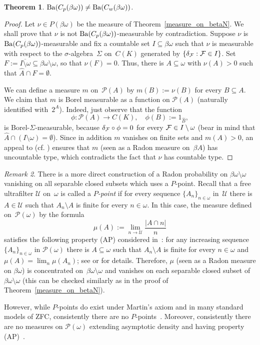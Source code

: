 \documentclass[12pt]{amsart}
\newcommand{\FF}{\protect{\mathcal F}}
\newcommand{\sm}{\setminus}
\newcommand{\sub}{\subseteq}
\newcommand{\Ba}{{\rm Ba}}
\newcommand{\UU}{{\mathcal U}}
\newcommand{\PP}{{\mathcal P}}
\newcommand{\0}{\protect{\bf 0}}
\newcommand{\1}{\protect{\bf 1}}
\newtheorem{theo}{Theorem}[section]
\theoremstyle{definition}
\theoremstyle{remark}
\newtheorem{remark}[theo]{Remark}
\numberwithin{equation}{section}
\begin{document}
\begin{theo}\label{neq_betaN}
$\Ba(C_p(\beta\omega)) \neq \Ba(C_w(\beta\omega))$.
\end{theo}
\begin{proof}
Let $\nu\in P(\beta\omega)$ be the measure of Theorem~\ref{measure_on_betaN}.
We shall prove that $\nu$ is not $\Ba(C_p(\beta\omega))$-measurable by contradiction. Suppose
$\nu$ is $\Ba(C_p(\beta\omega))$-measurable and fix a countable set $I\sub\beta\omega$ such that $\nu$ is measurable
with respect to the $\sigma$-algebra~$\Sigma$ on~$C(K)$ generated by $\{\delta_{\FF}: \FF\in I\}$. 
Set $F:=\overline{I\sm\omega} \sub \beta\omega \sm \omega$, so that
$\nu(F)=0$. Thus, there is $A \sub \omega$ with $\nu(A)>0$ such that 
$\widehat{A}\cap F=\emptyset$.

We can define a measure $m$ on~$\PP(A)$ by 
$m(B):=\nu(B)$ for every $B\sub A$. We claim that $m$ is Borel measurable as a function
on $\PP(A)$ (naturally identified with~$2^A$). Indeed, just observe that the function
$$
	\phi: \PP(A) \to C(K), \quad
	\phi(B):=1_{\widehat{B}},
$$
is Borel-$\Sigma$-measurable, because $\delta_{\FF} \circ \phi=0$
for every $\FF \in I \sm \omega$ (bear in mind that $\widehat{A}\cap (I\sm \omega)=\emptyset$).
Since in addition $m$ vanishes on finite sets and $m(A)>0$, an appeal to \cite[1J]{fre-tal} (cf. \cite[464Q]{freMT-4}) ensures that 
$m$ (seen as a Radon measure on~$\beta A$) has uncountable type, which contradicts
the fact that $\nu$ has countable type.
\end{proof}

\begin{remark}\label{remark:Ppoint}
There is a more direct construction of a Radon probability on $\beta\omega \sm \omega$ 
vanishing on all separable closed subsets which uses a $P$-point.
Recall that a free ultrafilter $\UU$ on~$\omega$ is called a {\em $P$-point} if for every sequence
$\{A_n\}_{n\in \omega}$ in~$\UU$ there is $A\in\UU$ such that $A_n\sm A$ is finite
for every $n\in \omega$. In this case, the measure defined on~$\mathcal{P}(\omega)$ by the formula
$$
	\mu(A) := \lim_{n\to\mathcal{U}}\frac{|A\cap n|}{n}
$$
satisfies the following property (AP) considered in~\cite{Mekler84}: for any increasing sequence $\{A_n\}_{n\in \omega}$ in $\mathcal{P}(\omega)$
there is $A \sub \omega$ such that $A_n\sm A$ is finite for every $n\in \omega$ and 
$\mu(A)=\lim_n\mu(A_n)$; see \cite{BFPR2001} or \cite{Mekler84} for details. 
Therefore, $\mu$ (seen as a Radon measure on $\beta\omega$)
is concentrated on~$\beta\omega \sm \omega$ and vanishes on each separable closed subset of $\beta\omega \sm \omega$
(this can be checked similarly as in the proof of Theorem~\ref{measure_on_betaN}).

However, while $P$-points do exist under Martin's axiom and in
many standard models of ZFC, consistently there are no $P$-points~\cite{Shelah82}. 
Moreover, consistently there are no measures on $\mathcal{P}(\omega)$ extending 
asymptotic density and having property (AP)~\cite{Mekler84}. 
\end{remark}
\end{document}
